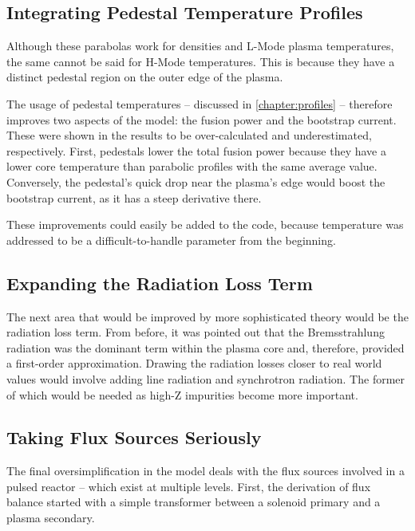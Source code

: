 \subsection{Integrating Pedestal Temperature Profiles}

 Although these parabolas work for densities and L-Mode plasma temperatures, the same cannot be said for H-Mode temperatures. This is because they have a distinct pedestal region on the outer edge of the plasma.

The usage of pedestal temperatures -- discussed in \cref{chapter:profiles} -- therefore improves two aspects of the model: the fusion power and the bootstrap current. These were shown in the results to be over-calculated and underestimated, respectively. First, pedestals lower the total fusion power because they have a lower core temperature than parabolic profiles with the same average value. Conversely, the pedestal's quick drop near the plasma's edge would boost the bootstrap current, as it has a steep derivative there.

These improvements could easily be added to the code, because temperature was addressed to be a difficult-to-handle parameter from the beginning.

\subsection{Expanding the Radiation Loss Term}

The next area that would be improved by more sophisticated theory would be the radiation loss term. From before, it was pointed out that the Bremsstrahlung radiation was the dominant term within the plasma core and, therefore, provided a first-order approximation. Drawing the radiation losses closer to real world values would involve adding line radiation and synchrotron radiation. The former of which would be needed as high-Z impurities become more important.

\subsection{Taking Flux Sources Seriously}

The final oversimplification in the model deals with the flux sources involved in a pulsed reactor -- which exist at multiple levels. First, the derivation of flux balance started with a simple transformer between a solenoid primary and a plasma secondary. 

